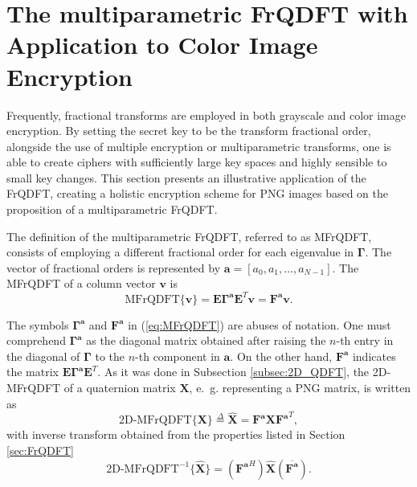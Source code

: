 \section{The multiparametric FrQDFT with Application to Color Image Encryption}
\label{sec:multi}
Frequently, fractional transforms are employed in both grayscale \cite{tao2010image} and color image \cite{kang2018reality, kang2018color} encryption. By setting the secret key to be the transform fractional order, alongside the use of multiple encryption or multiparametric transforms, one is able to create ciphers with sufficiently large key spaces and highly sensible to small key changes. This section presents an illustrative application of the FrQDFT, creating a holistic encryption scheme for PNG images based on the proposition of a multiparametric FrQDFT.

The definition of the multiparametric FrQDFT, referred to as MFrQDFT, consists of employing a different fractional order for each eigenvalue in $ \mathbf{\Gamma} $. The vector of fractional orders is represented by $ \mathbf{a} = [a_0, a_1, \dots, a_{N-1}] $. The MFrQDFT of a column vector $ \mathbf{v} $ is
\begin{equation}
\label{eq:MFrQDFT}
\text{MFrQDFT}\{ \mathbf{v} \} = \mathbf{E} \mathbf{\Gamma^a} \mathbf{E}^T \mathbf{v} = \mathbf{F^a} \mathbf{v}.
\end{equation}

The symbols $ \mathbf{\Gamma^a} $ and $ \mathbf{F^a} $ in (\ref{eq:MFrQDFT}) are abuses of notation. One must comprehend $ \mathbf{\Gamma^a} $ as the diagonal matrix obtained after raising the $ n $-th entry in the diagonal of $ \mathbf{\Gamma} $ to the $ n $-th component in $ \mathbf{a} $. On the other hand, $ \mathbf{F^a} $ indicates the matrix $ \mathbf{E} \mathbf{\Gamma^a} \mathbf{E}^T $. As it was done in Subsection \ref{subsec:2D_QDFT}, the 2D-MFrQDFT of a quaternion matrix $ \mathbf{X} $, e.~g. representing a PNG matrix, is written as
\begin{equation}
\label{eq:2DMFrQDFT}
\text{2D-MFrQDFT}\{\mathbf{X} \} \overset{\Delta}{=} \mathbf{\widehat{X}} = \mathbf{F^a} \mathbf{X} \mathbf{F^a}^T,
\end{equation}
with inverse transform obtained from the properties listed in Section \ref{sec:FrQDFT}
\begin{equation}
\label{eq:2DMFrQDFTinv}
\text{2D-MFrQDFT}^{-1}\{ \mathbf{\widehat{X}} \} = (\mathbf{F^a}^H) \mathbf{\widehat{X}} (\overline{\mathbf{F^a}}).
\end{equation}

